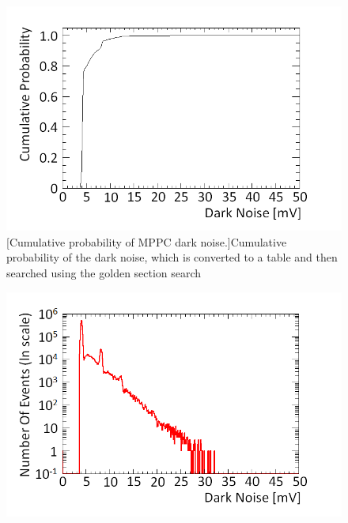 
\begin{figure}[!h]
\centering
\begin{minipage}{.45\textwidth}
  \centering
  \includegraphics[width=\linewidth]{Chapter4/Figs/Raster/cumulative_prob_dark_noiseMedText.png}
  [Cumulative probability of MPPC dark noise.]{Cumulative probability of the dark noise, which is converted to a table and then searched using the golden section search} 
  \label{fig:cumulative_prob_dark}
  \vspace{0.956cm} %
\end{minipage}%
\qquad
\begin{minipage}{.45\textwidth}
  \centering
  \includegraphics[width=\linewidth]{Chapter4/Figs/darkNoiseLogMedText.png} 

\end{minipage}
\end{figure}
